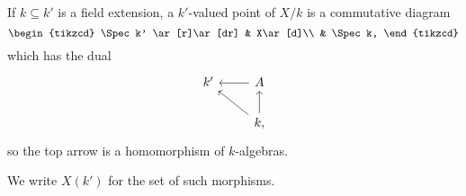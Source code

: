 \begin{enumerate}
		If $k \subseteq k'$ is a field extension, a $k'$-valued point of $X/k$ is
		a commutative diagram
		\[\begin{tikzcd}
			\Spec k' \ar[r]\ar[dr] & X\ar[d]\\
			& \Spec k,
		\end{tikzcd}\]
		which has the dual
		\[\begin{tikzcd}
			k' & A\ar[l]\\
			& k\ar[u]\ar[ul],
		\end{tikzcd}\]
		so the top arrow is a homomorphism of  $k$-algebras.

		We write $X(k')$ for the set of such morphisms.
\end{enumerate}
